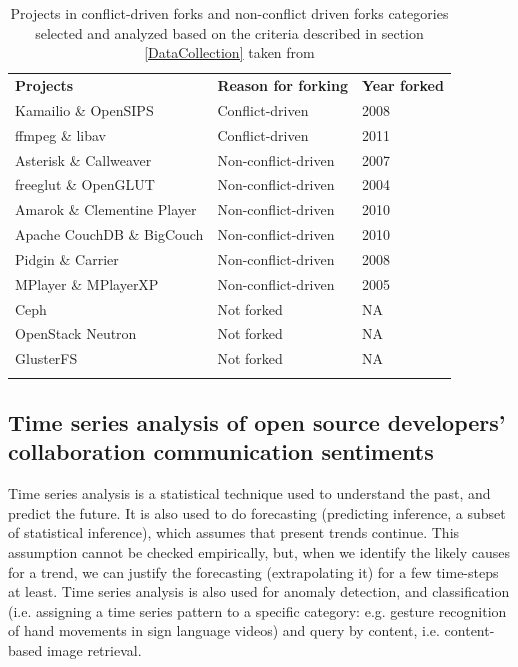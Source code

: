 \documentclass[12pt,letterpaper]{gthesis2}  %
\begin{document}
\begin{table}
\centering
\caption{Projects in conflict-driven forks and non-conflict driven forks categories selected and analyzed based on the criteria described in section \ref{DataCollection} taken from \cite{Robles}}
\label{forkedProjectsDataCollected}
\begin{tabular}{p{} p{} p{}}
\hline\noalign{\smallskip}
\textbf{Projects} & \textbf{Reason for forking} & \textbf{Year forked}\\
\noalign{\smallskip}\hline\noalign{\smallskip}
Kamailio \& OpenSIPS & Conflict-driven & 2008 \\ \hline
ffmpeg \& libav & Conflict-driven & 2011 \\ \hline
Asterisk \& Callweaver & Non-conflict-driven & 2007 \\ \hline
freeglut \& OpenGLUT & Non-conflict-driven & 2004 \\ \hline
Amarok \& Clementine Player & Non-conflict-driven & 2010 \\ \hline
Apache CouchDB \& BigCouch & Non-conflict-driven & 2010 \\ \hline
Pidgin \& Carrier & Non-conflict-driven & 2008 \\ \hline
MPlayer \& MPlayerXP & Non-conflict-driven & 2005 \\ \hline
Ceph  & Not forked & NA \\ \hline
OpenStack Neutron & Not forked & NA \\ \hline
GlusterFS & Not forked & NA \\ 
\noalign{\smallskip}\hline
\end{tabular}
\end{table}


\subsection{Time series analysis of open source developers’ collaboration communication sentiments}

Time series analysis is a statistical technique used to understand the past, and predict the future. It is also used to do forecasting (predicting inference, a subset of statistical inference), which assumes that present trends continue. This assumption cannot be
checked empirically, but, when we identify the likely causes for a trend, we can justify the forecasting (extrapolating it) for a few time-steps at least. Time series analysis is also used for anomaly detection, and classification (i.e. assigning a time series pattern to a specific category: e.g. gesture recognition of hand movements in sign language videos) and query by content, i.e. content-based image retrieval.
\end{document}
